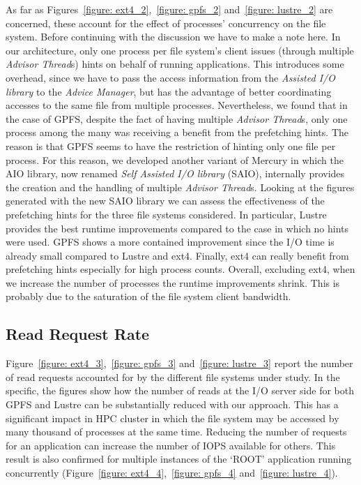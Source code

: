 As far as Figures~\ref{figure: ext4_2},~\ref{figure: gpfs_2} and~\ref{figure: lustre_2} are concerned, these account for the effect of processes' concurrency on the file system. Before continuing with the discussion we have to make a note here. 
In our architecture, only one process per file system's client issues (through multiple \textit{Advisor Thread}s) hints on behalf of running applications. This introduces some overhead, since we have to pass the access information from the 
\textit{Assisted I/O library} to the \textit{Advice Manager}, but has the advantage of better coordinating accesses to the same file from multiple processes. Nevertheless, we found that in the case of GPFS, despite the fact of having multiple 
\textit{Advisor Thread}s, only one process among the many was receiving a benefit from the prefetching hints. The reason is that GPFS seems to have the restriction of hinting only one file per process. For this reason, we developed another variant 
of Mercury in which the AIO library, now renamed \textit{Self Assisted I/O library} (SAIO), internally provides the creation and the handling of multiple \textit{Advisor Thread}s. Looking at the figures generated with the new SAIO library we can 
assess the effectiveness of the prefetching hints for the three file systems considered. In particular, Lustre provides the best runtime improvements compared to the case in which no hints were used. GPFS shows a more contained improvement since the 
I/O time is already small compared to Lustre and ext4. Finally, ext4 can really benefit from prefetching hints especially for high process counts. Overall, excluding ext4, when we increase the number of processes the runtime improvements shrink. This 
is probably due to the saturation of the file system client bandwidth.

\subsection{Read Request Rate}
\label{subsec: reads}
Figure~\ref{figure: ext4_3},~\ref{figure: gpfs_3} and~\ref{figure: lustre_3} report the number of read requests accounted for by the different file systems under study. In the specific, the figures show how the number of reads at the I/O server side 
for both GPFS and Lustre can be substantially reduced with our approach. This has a significant impact in HPC cluster in which the file system may be accessed by many thousand of processes at the same time. Reducing the number of requests for an application 
can increase the number of IOPS available for others. This result is also confirmed for multiple instances of the `ROOT' application running concurrently (Figure~\ref{figure: ext4_4},~\ref{figure: gpfs_4} and~\ref{figure: lustre_4}).

